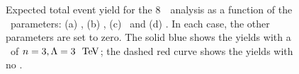 \begin{figure}[htbp]
\begin{center}
\caption{
\small
Expected total event yield for the 8~\tev\ analysis as a function of the \TGC\ parameters: (a) \ffourg, (b) \ffourZ,
(c) \ffiveg\ and (d) \ffiveZ. In each case, the other parameters are set to
zero. The solid blue shows the yields with a \formfactor\ of $n=3,
\Lambda=3~\tev$; the dashed red curve shows the yields with no \formfactor.
 }
\label{fig:TGC-yield-curves}
\end{center}
\end{figure}

